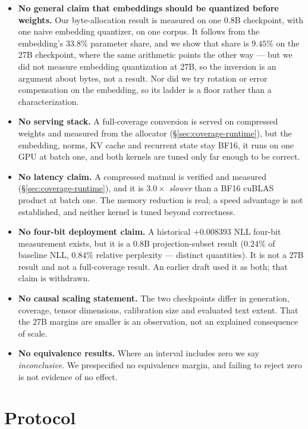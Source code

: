 \documentclass[11pt]{article}
\begin{document}
\begin{itemize}
\item \textbf{No general claim that embeddings should be quantized before
weights.} Our byte-allocation result is measured on one 0.8B checkpoint, with
one naive embedding quantizer, on one corpus. It follows from the embedding's
$33.8\%$ parameter share, and we show that share is $9.45\%$ on the 27B
checkpoint, where the same arithmetic points the other way --- but we did not
measure embedding quantization at 27B, so the inversion is an argument about
bytes, not a result. Nor did we try rotation or error compensation on the
embedding, so its ladder is a floor rather than a characterization.
\item \textbf{No serving stack.} A full-coverage conversion is served on
compressed weights and measured from the allocator
(\S\ref{sec:coverage-runtime}), but the embedding, norms, KV cache and
recurrent state stay BF16, it runs on one GPU at batch one, and both kernels are
tuned only far enough to be correct.
\item \textbf{No latency claim.} A compressed matmul is verified and measured
(\S\ref{sec:coverage-runtime}), and it is $3.0\times$ \emph{slower} than a BF16
cuBLAS product at batch one. The memory reduction is real; a speed advantage is
not established, and neither kernel is tuned beyond correctness.
\item \textbf{No four-bit deployment claim.} A historical $+0.008393$ NLL
four-bit measurement exists, but it is a 0.8B projection-subset result
($0.24\%$ of baseline NLL, $0.84\%$ relative perplexity --- distinct
quantities). It is not a 27B result and not a full-coverage result. An earlier
draft used it as both; that claim is withdrawn.
\item \textbf{No causal scaling statement.} The two checkpoints differ in
generation, coverage, tensor dimensions, calibration size and evaluated text
extent. That the 27B margins are smaller is an observation, not an explained
consequence of scale.
\item \textbf{No equivalence results.} Where an interval includes zero we say
\emph{inconclusive}. We prespecified no equivalence margin, and failing to
reject zero is not evidence of no effect.
\end{itemize}

\section{Protocol}
\label{sec:protocol}
\end{document}
